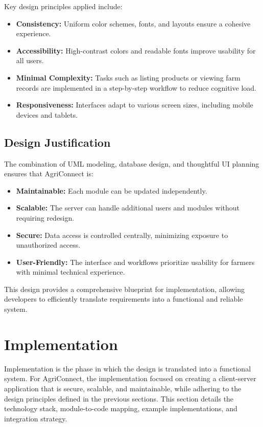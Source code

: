 \documentclass[12pt,a4paper]{article}
\begin{document}
Key design principles applied include:

\begin{itemize}
    \item \textbf{Consistency:} Uniform color schemes, fonts, and layouts ensure a cohesive experience.
    \item \textbf{Accessibility:} High-contrast colors and readable fonts improve usability for all users.
    \item \textbf{Minimal Complexity:} Tasks such as listing products or viewing farm records are implemented in a step-by-step workflow to reduce cognitive load.
    \item \textbf{Responsiveness:} Interfaces adapt to various screen sizes, including mobile devices and tablets.
\end{itemize}

\subsection{Design Justification}

The combination of UML modeling, database design, and thoughtful UI planning ensures that AgriConnect is:

\begin{itemize}
    \item \textbf{Maintainable:} Each module can be updated independently.
    \item \textbf{Scalable:} The server can handle additional users and modules without requiring redesign.
    \item \textbf{Secure:} Data access is controlled centrally, minimizing exposure to unauthorized access.
    \item \textbf{User-Friendly:} The interface and workflows prioritize usability for farmers with minimal technical experience.
\end{itemize}

This design provides a comprehensive blueprint for implementation, allowing developers to efficiently translate requirements into a functional and reliable system.


\section{Implementation}

Implementation is the phase in which the design is translated into a functional system. For AgriConnect, the implementation focused on creating a client-server application that is secure, scalable, and maintainable, while adhering to the design principles defined in the previous sections. This section details the technology stack, module-to-code mapping, example implementations, and integration strategy.
\end{document}
